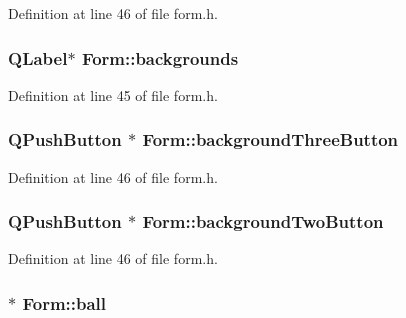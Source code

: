 Definition at line 46 of file form.h.\hypertarget{class_form_ab0d3fbc5a7fa42afd081f2dd21dae053}{
\subsubsection[{backgrounds}]{\setlength{\rightskip}{0pt plus 5cm}QLabel$\ast$ {\bf Form::backgrounds}}}
\label{class_form_ab0d3fbc5a7fa42afd081f2dd21dae053}


Definition at line 45 of file form.h.\hypertarget{class_form_a8f813fd062201f9f61458446ede57100}{
\subsubsection[{backgroundThreeButton}]{\setlength{\rightskip}{0pt plus 5cm}QPushButton $\ast$ {\bf Form::backgroundThreeButton}}}
\label{class_form_a8f813fd062201f9f61458446ede57100}


Definition at line 46 of file form.h.\hypertarget{class_form_adbf445820483e664f777256868fd705e}{
\subsubsection[{backgroundTwoButton}]{\setlength{\rightskip}{0pt plus 5cm}QPushButton $\ast$ {\bf Form::backgroundTwoButton}}}
\label{class_form_adbf445820483e664f777256868fd705e}


Definition at line 46 of file form.h.\hypertarget{class_form_a0e07a371edadd1e19a9e32114a16aa08}{
\subsubsection[{ball}]{$\ast$ {\bf Form::ball}}}
\label{class_form_a0e07a371edadd1e19a9e32114a16aa08}


